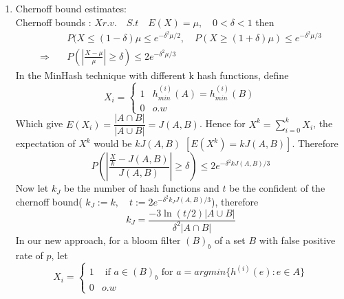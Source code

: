 \documentclass[11pt]{amsart}
\theoremstyle{remark}
\numberwithin{equation}{section}
\begin{document}
\begin{enumerate}
\item Chernoff bound estimates:\\

Chernoff bounds :
 $X r.v.\quad S.t\quad E(X)=\mu,\quad 0<\delta<1$ then
\begin{align*}
&P(X\leq(1-\delta)\mu\leq e^{-\delta^2\mu/2},\quad P(X\geq(1+\delta)\mu)\leq e^{-\delta^2\mu/3} \\
\Rightarrow\quad &P(\left|\frac{X-\mu}{\mu}\right|\geq\delta)\leq2e^{-\delta^2\mu/3}
\end{align*}
In the MinHash technique with different k hash functions, define
$$X_i=\left\{
\begin{array}{lll}
1 &h^{(i)}_{min}(A)=h^{(i)}_{min}(B)\\
0& o.w
\end{array}
\right.$$
Which give 
$E(X_i)= \dfrac{|A\cap B|}{|A\cup B|}=J(A,B)$.
Hence for 
$X^k=\sum\limits_{i=0}^k X_i$,
the expectation of $X^k$ would be $kJ(A,B)$
$[E(X^k)=k J(A,B)]$. Therefore
$$P\left( \left|\dfrac{\frac{X}{k}-J(A,B)}{J(A,B)}\right|\geq\delta\right)\leq 2e^{-\delta^2kJ(A,B)/3}$$
Now let $k_J$ be the number of hash functions and $t$ be the confident of the chernoff bound( $k_J:=k,\quad t:=2e^{-\delta^2k_JJ(A,B)/3}$), therefore
$$k_J=\dfrac{-3\ln(t/2)|A\cup B|}{\delta^2 |A\cap B|}$$
In our new approach, for a bloom filter $(B)_b$ of a set $B$ with false positive rate of $p$, let 
$$X_i=\left\{
\begin{array}{ll}
1&\text{ if } a\in(B)_b\text{ for } a=argmin\{h^{(i)}{(e)}:e\in A\}\\
0& o.w
\end{array}
\right.$$


\end{enumerate}
\end{document}
